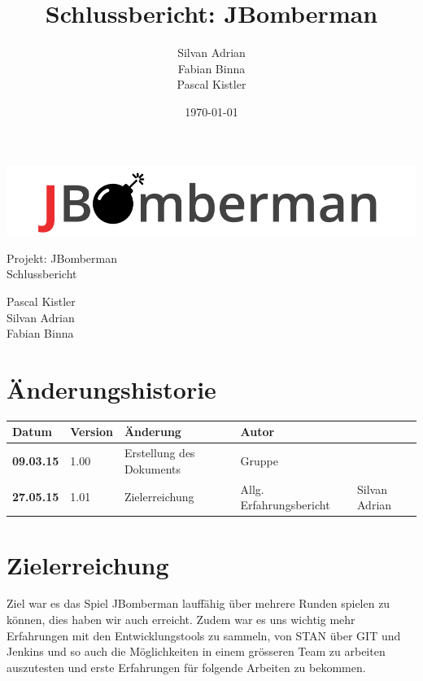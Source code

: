 \documentclass[11pt]{scrartcl}
\title{Schlussbericht: JBomberman}
\author{Silvan Adrian \\ Fabian Binna \\ Pascal Kistler}
\date{\today{}}
\begin{document}
\def\arraystretch{1.5}
\begin{titlepage}
\begin{center}
\vspace{10em}
\includegraphics[scale=2]{jbomberman}
\vspace{10em}
\end{center}
\begin{center}
\huge {Projekt: JBomberman} \\
\huge {Schlussbericht}
\end{center}
\begin{center}
\vspace{10em}
\LARGE {Pascal Kistler} \\
\LARGE {Silvan Adrian} \\
\LARGE {Fabian Binna}
\end{center}

\end{titlepage}

\newpage
\section{Änderungshistorie}
\label{sec:Änderungen}

\begin{tabularx}{\linewidth}{l l l l}
\textbf{Datum} & \textbf{Version} & \textbf{Änderung}  & \textbf{Autor} \\
\hline
\textbf{09.03.15} & 1.00 & Erstellung des Dokuments & Gruppe \\
\textbf{27.05.15} & 1.01 & Zielerreichung & Allg. Erfahrungsbericht & Silvan 
Adrian\\
\end{tabularx}

\newpage
\tableofcontents
\newpage

\section{Zielerreichung}
Ziel war es das Spiel JBomberman lauffähig über mehrere Runden spielen zu 
können, dies haben wir auch erreicht.
Zudem war es uns wichtig mehr Erfahrungen mit den Entwicklungstools zu sammeln,
von STAN über GIT und Jenkins und so auch die Möglichkeiten 
in einem grösseren Team zu arbeiten auszutesten und erste Erfahrungen 
für folgende Arbeiten zu bekommen.
\end{document}

